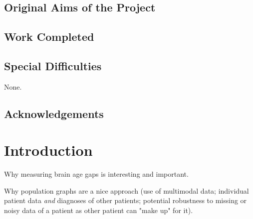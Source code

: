 \documentclass[12pt,a4paper,twoside, openright, hidelinks]{report}
\begin{document}

\section*{Original Aims of the Project}

\section*{Work Completed}

\section*{Special Difficulties}

None.

\tableofcontents

\newpage
\section*{Acknowledgements}

\pagestyle{headings}

\chapter{Introduction}

Why measuring brain age gaps is interesting and important.

Why population graphs are a nice approach (use of multimodal data; individual patient data \textit{and} diagnoses of other patients; potential robustness to missing or noisy data of a patient as other patient can "make up" for it).
\end{document}
